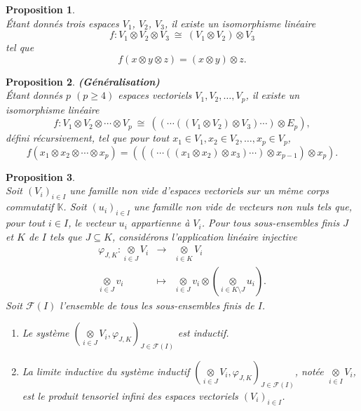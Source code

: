 \documentclass[a4paper, 14pt]{report}
\newtheorem{proposition}{Proposition}[section]
\begin{document}
\begin{onehalfspace}
{			\begin{proposition}\cite{greub2012linear}\\
				Étant donnés trois espaces \(V_1\), \(V_2\), \(V_3\), il existe un isomorphisme linéaire  
				\[
				f : V_1 \otimes V_2 \otimes V_3 \ \cong \ (V_1 \otimes V_2) \otimes V_3
				\]
				tel que
				\[
				f(x \otimes y \otimes z) = (x \otimes y) \otimes z.
				\]
			\end{proposition}
			
			
			\begin{proposition}\textbf{(Généralisation)}  \cite{greub2012linear}\\
				Étant donnés \(p\) \((p \geq 4)\) espaces vectoriels  \(V_1, V_2, \dots, V_p\), il existe un isomorphisme linéaire  
				\[
				f : V_1 \otimes V_2 \otimes \cdots \otimes V_p \ \cong \ ((\cdots((V_1 \otimes V_2) \otimes V_3) \cdots) \otimes E_p),
				\]
				défini récursivement, tel que pour tout \(x_1 \in V_1, x_2 \in V_2, \dots, x_p \in V_p\),
				\[
				f(x_1 \otimes x_2 \otimes \cdots \otimes x_p) = (((\cdots((x_1 \otimes x_2) \otimes x_3) \cdots) \otimes x_{p-1}) \otimes x_p).
				\]
			\end{proposition}
			
			
			
			\begin{proposition} \cite{Guichardet} \\
				Soit $(V_i)_{i\in I}$ une famille non vide d’espaces vectoriels sur un même corps commutatif  $\mathbb{K}$. Soit $(u_i)_{i\in I}$ une famille non vide de vecteurs non nuls tels que, pour tout $i\in I$, le vecteur $u_i$ appartienne à $V_i$. Pour tous sous-ensembles finis $J$ et $K$ de $I$ tels que $J\subseteq K$, considérons l'application linéaire injective  
				$$\begin{array}{rlll}
					\varphi_{J,K}: \underset{i\in J}\otimes V_i& \longrightarrow& \underset{i\in K}\otimes V_i\\
					\underset{i\in J}\otimes v_i&\longmapsto& \underset{i\in J}\otimes v_i\otimes(\underset{i\in K\setminus J}\otimes u_i).
				\end{array}
				$$
				Soit $\mathcal{F}(I)$ l'ensemble de tous les sous-ensembles finis de $I$. 
				\begin{enumerate}[label=\roman*)]
					\item Le système $(\underset{i\in J}\otimes V_i, \varphi_{J,K})_{J\in \mathcal{F}(I)}$ est inductif.
					\item La limite inductive du système inductif $(\underset{i\in J}\otimes V_i, \varphi_{J,K})_{J\in \mathcal{F}(I)}$, notée $\underset{i\in I}\otimes V_i$, est le produit tensoriel infini des espaces vectoriels $(V_i)_{i\in I}$.
				\end{enumerate}
			\end{proposition}
			
}
\end{onehalfspace}
\end{document}
